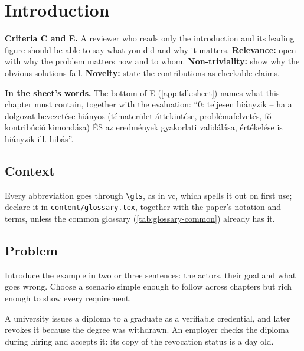 \section{Introduction}\label{app:chapters:intro}
\textbf{Criteria C and E.} A reviewer who reads only the introduction and its leading figure should be able to say what you did and why it matters.
\textbf{Relevance:} open with why the problem matters now and to whom.
\textbf{Non-triviality:} show why the obvious solutions fail.
\textbf{Novelty:} state the contributions as checkable claims.

\textbf{In the sheet's words.} The bottom of E (\cref{app:tdk:sheet}) names what this chapter must contain, together with the evaluation: \enquote{0: teljesen hiányzik -- ha a dolgozat bevezetése hiányos (tématerület áttekintése, problémafelvetés, fő kontribúció kimondása) ÉS az eredmények gyakorlati validálása, értékelése is hiányzik ill. hibás}.

\subsection{Context}\label{app:chapters:context}
Every abbreviation goes through \texttt{\textbackslash gls}, as in \gls{vc}, which spells it out on first use; declare it in \texttt{content/glossary.tex}, together with the paper's notation and terms, unless the common glossary (\cref{tab:glossary-common}) already has it.

\subsection[Problem]{Problem\skimmark}\label{app:chapters:problem}
Introduce the example in two or three sentences: the actors, their goal and what goes wrong. Choose a scenario simple enough to follow across chapters but rich enough to show every requirement.
\begin{runningexample}
A university issues a diploma to a graduate as a verifiable credential, and later revokes it because the degree was withdrawn. An employer checks the diploma during hiring and accepts it: its copy of the revocation status is a day old.
\end{runningexample}

